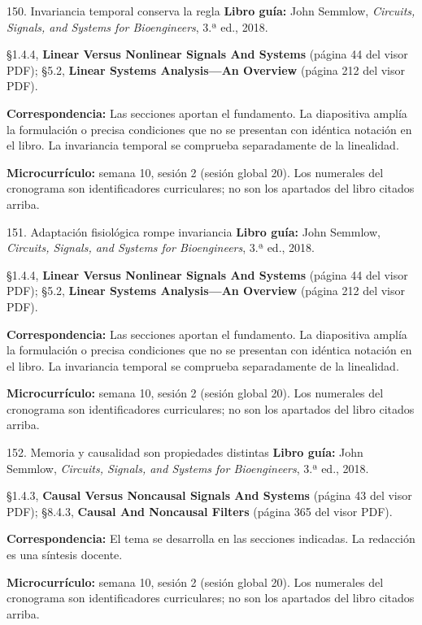 \documentclass[
  10pt,
  ignorenonframetext,
  aspectratio=169,
  spanish,
]{beamer}
\begin{document}
\begin{frame}{150. Invariancia temporal conserva la regla}
\label{invariancia-temporal-conserva-la-regla}
\textbf{Libro guía:} John Semmlow, \emph{Circuits, Signals, and Systems
for Bioengineers}, 3.ª ed., 2018.

§1.4.4, \textbf{Linear Versus Nonlinear Signals And Systems} (página 44
del visor PDF); §5.2, \textbf{Linear Systems Analysis---An Overview}
(página 212 del visor PDF).

\textbf{Correspondencia:} Las secciones aportan el fundamento. La
diapositiva amplía la formulación o precisa condiciones que no se
presentan con idéntica notación en el libro. La invariancia temporal se
comprueba separadamente de la linealidad.

\textbf{Microcurrículo:} semana 10, sesión 2 (sesión global 20). Los
numerales del cronograma son identificadores curriculares; no son los
apartados del libro citados arriba.
\end{frame}

\begin{frame}{151. Adaptación fisiológica rompe invariancia}
\label{adaptaciuxf3n-fisioluxf3gica-rompe-invariancia}
\textbf{Libro guía:} John Semmlow, \emph{Circuits, Signals, and Systems
for Bioengineers}, 3.ª ed., 2018.

§1.4.4, \textbf{Linear Versus Nonlinear Signals And Systems} (página 44
del visor PDF); §5.2, \textbf{Linear Systems Analysis---An Overview}
(página 212 del visor PDF).

\textbf{Correspondencia:} Las secciones aportan el fundamento. La
diapositiva amplía la formulación o precisa condiciones que no se
presentan con idéntica notación en el libro. La invariancia temporal se
comprueba separadamente de la linealidad.

\textbf{Microcurrículo:} semana 10, sesión 2 (sesión global 20). Los
numerales del cronograma son identificadores curriculares; no son los
apartados del libro citados arriba.
\end{frame}

\begin{frame}{152. Memoria y causalidad son propiedades distintas}
\label{memoria-y-causalidad-son-propiedades-distintas}
\textbf{Libro guía:} John Semmlow, \emph{Circuits, Signals, and Systems
for Bioengineers}, 3.ª ed., 2018.

§1.4.3, \textbf{Causal Versus Noncausal Signals And Systems} (página 43
del visor PDF); §8.4.3, \textbf{Causal And Noncausal Filters} (página
365 del visor PDF).

\textbf{Correspondencia:} El tema se desarrolla en las secciones
indicadas. La redacción es una síntesis docente.

\textbf{Microcurrículo:} semana 10, sesión 2 (sesión global 20). Los
numerales del cronograma son identificadores curriculares; no son los
apartados del libro citados arriba.
\end{frame}
\end{document}
